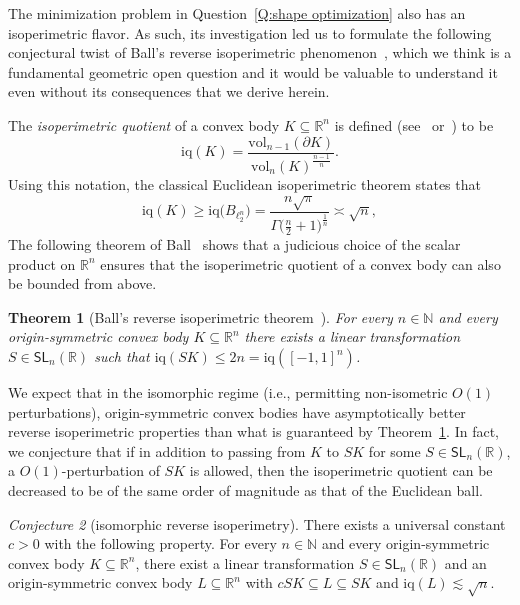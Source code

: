 \documentclass[11pt,reqno]{amsart}
\renewcommand{\le}{\leqslant}
\renewcommand{\ge}{\geqslant}
\newcommand{\R}{\mathbb R}
\newtheorem{theorem}{Theorem}
\theoremstyle{remark}
\newtheorem{conjecture}[theorem]{Conjecture}
\newcommand{\iq}{\mathrm{iq}}
\newcommand{\SL}{\mathsf{SL}}
\renewcommand{\subset}{\subseteq}
\newcommand{\N}{\mathbb N}
\newcommand{\vol}{\mathrm{vol}}
\renewcommand{\1}{\mathbf 1}
\begin{document}
The minimization problem in Question~\ref{Q:shape optimization} also has an  isoperimetric flavor. As such, its investigation led us to
formulate the following  conjectural  twist of Ball's reverse isoperimetric phenomenon~\cite{Bal91-reverse}, which we think is a fundamental geometric open question and it would be valuable to understand it even without its   consequences that we derive herein.


The {\em isoperimetric quotient} of a convex body $K\subset \R^n$ is defined (see~\cite[page~269]{Had57} or~\cite{Sch89}) to be
\begin{equation}\label{eq:def iq}
\iq(K)= \frac{\vol_{n-1}(\partial K)}{\vol_n(K)^{\frac{n-1}{n}}}.
\end{equation}
Using this notation, the classical Euclidean isoperimetric theorem states that
\begin{equation}\label{eq:quote ispoperimetric theorem}
\iq(K)\ge \iq\big(B_{\ell_2^n}\big)= \frac{n\sqrt{\pi}}{\Gamma\big(\frac{n}{2}+1\big)^{\frac{1}{n}}}\asymp \sqrt{n},
\end{equation}
The following theorem of Ball~\cite{Bal91-reverse} shows that a judicious  choice of the scalar product on $\R^n$  ensures that the isoperimetric quotient of a convex body can also be bounded from above.


\begin{theorem}[Ball's reverse isoperimetric theorem~\cite{Bal91-reverse}]\label{thm:ball reverse} For every $n\in \N$ and every origin-symmetric convex body $K\subset \R^n$ there exists a linear transformation $S\in \SL_n(\R)$ such that $\iq(SK)\le 2n=\iq([-1,1]^n)$.
\end{theorem}

 We expect that in the isomorphic regime (i.e.,  permitting non-isometric $O(1)$ perturbations), origin-symmetric convex bodies have asymptotically better reverse isoperimetric properties than what is guaranteed by Theorem~\ref{thm:ball reverse}. In fact, we conjecture that if in addition to passing from $K$ to $SK$ for some $S\in \SL_n(\R)$, a $O(1)$-perturbation of $SK$ is allowed, then the isoperimetric quotient can be decreased to be of the same order of magnitude as that of the Euclidean ball.

\begin{conjecture}[isomorphic reverse isoperimetry]\label{isomorphic reverse conj1} There exists a universal constant $c>0$ with the following property. For every $n\in \N$ and every origin-symmetric convex body $K\subset \R^n$, there exist a linear transformation $S\in \SL_n(\R)$ and an origin-symmetric convex body $L\subset \R^n$ with $c SK\subset L\subset SK$ and $\iq(L)\lesssim \sqrt{n}$.
\end{conjecture}
\end{document}
